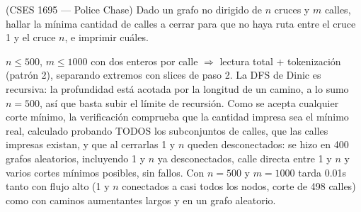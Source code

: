 
(CSES 1695 — Police Chase) Dado un grafo no dirigido de $n$ cruces y $m$ calles, hallar la mínima cantidad de calles a cerrar para que no haya ruta entre el cruce 1 y el cruce $n$, e imprimir cuáles.

 $n \le 500$, $m \le 1000$ con dos enteros por calle $\Rightarrow$ lectura total + tokenización (patrón 2), separando extremos con slices de paso 2. La DFS de Dinic es recursiva: la profundidad está acotada por la longitud de un camino, a lo sumo $n = 500$, así que basta subir el límite de recursión. Como se acepta cualquier corte mínimo, la verificación comprueba que la cantidad impresa sea el mínimo real, calculado probando TODOS los subconjuntos de calles, que las calles impresas existan, y que al cerrarlas 1 y $n$ queden desconectados: se hizo en 400 grafos aleatorios, incluyendo 1 y $n$ ya desconectados, calle directa entre 1 y $n$ y varios cortes mínimos posibles, sin fallos. Con $n = 500$ y $m = 1000$ tarda \aprox{}0.01s tanto con flujo alto (1 y $n$ conectados a casi todos los nodos, corte de 498 calles) como con caminos aumentantes largos y en un grafo aleatorio.


